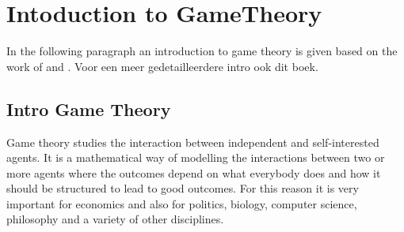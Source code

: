 \chapter{Intoduction to GameTheory}
\label{cha:1}
%


In the following paragraph an introduction to game theory is given based on the work of  and . Voor een meer gedetailleerdere intro ook dit boek. 
\section{Intro Game Theory}
\label{Cha:1:Intro.Game.Theory}




Game theory studies the interaction between independent and self-interested agents. It is a mathematical way of modelling the interactions between two or more agents where the outcomes depend on what everybody does and how it should be structured to lead to good outcomes. For this reason it is very important for economics and also for politics, biology, computer science, philosophy and a variety of other disciplines.  \\

